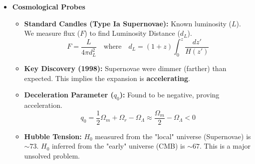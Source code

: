 \documentclass{sciposter}
\begin{document}
\begin{multicols}{3}
\begin{itemize}
    \item \textbf{Cosmological Probes}
    \begin{itemize}
        \item \textbf{Standard Candles (Type Ia Supernovae):} Known luminosity ($L$). We measure flux ($F$) to find Luminosity Distance ($d_L$).
        $$F = \frac{L}{4\pi d_L^2} \quad \text{where} \quad d_L = (1+z) \int_0^z \frac{dz'}{H(z')}$$
        \item \textbf{Key Discovery (1998):} Supernovae were dimmer (farther) than expected. This implies the expansion is \textbf{accelerating}.
        \item \textbf{Deceleration Parameter ($q_0$):} Found to be negative, proving acceleration.
        $$q_0 = \frac{1}{2}\Omega_m + \Omega_r - \Omega_\Lambda \approx \frac{\Omega_m}{2} - \Omega_\Lambda < 0$$
        \item \textbf{Hubble Tension:} $H_0$ measured from the "local" universe (Supernovae) is $\sim 73$. $H_0$ inferred from the "early" universe (CMB) is $\sim 67$. This is a major unsolved problem.
    \end{itemize}
\end{itemize}


\end{multicols}
\end{document}
